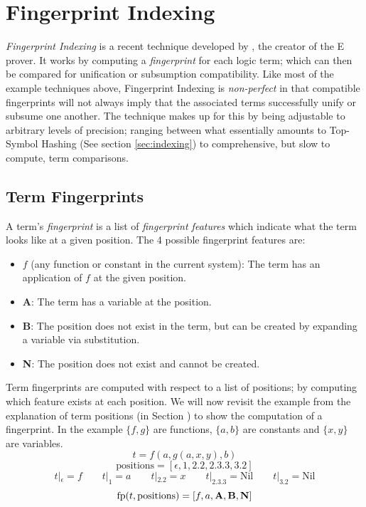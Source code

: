 \section{Fingerprint Indexing}
\label{sec:fingerprint}

\emph{Fingerprint Indexing} is a recent technique developed by , the creator
of the E prover. It works by computing a \emph{fingerprint} for each logic term;
which can then be compared for unification or subsumption compatibility. 
Like most of the example techniques above,
Fingerprint Indexing is \emph{non-perfect} in that compatible fingerprints will not
always imply that the associated terms successfully unify or subsume one another. The technique
makes up for this by being adjustable to arbitrary levels of precision; ranging between
what essentially amounts to Top-Symbol Hashing (See section \ref{sec:indexing})
to comprehensive, but slow to compute, term comparisons.

\subsection{Term Fingerprints}
\label{sec:fingerprints}

A term's \emph{fingerprint} is a list of \emph{fingerprint features} which
indicate what the term looks like at a given position. The 4 possible
fingerprint features are:
\begin{itemize}
\item $f$ (any function or constant in the current system): The term has an application of $f$ at the given position.
\item \textbf{A}: The term has a variable at the position.
\item \textbf{B}: The position does not exist in the term, but can be created
by expanding a variable via substitution.
\item \textbf{N}: The position does not exist and cannot be created.
\end{itemize}
Term fingerprints are computed with respect to a list of positions; by
computing which feature exists at each position. We will now revisit the example from
the explanation of term positions (in Section \label{sec:terminology}) to show
the computation of a fingerprint. In the example $\{f,g\}$ are functions, $\{a,b\}$ are
constants and $\{x,y\}$ are variables.
\[t = f(a, g(a, x, y), b)\]
\[\text{positions} = [\epsilon, 1, 2.2, 2.3.3, 3.2] \]
\[t|_{\epsilon} = f \quad\quad t|_{1} = a \quad\quad  t|_{2.2} = x \quad\quad  t|_{2.3.3} = \text{Nil} \quad\quad  t|_{3.2} = \text{Nil}\]
\[\text{fp}(t, \text{positions}) = [f, a, \textbf{A}, \textbf{B}, \textbf{N}] \]

